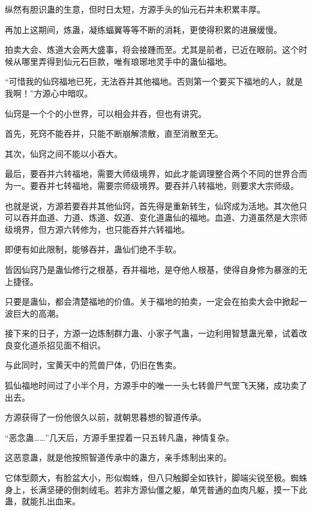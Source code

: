 
\begin{this_body}



纵然有胆识蛊的生意，但时日太短，方源手头的仙元石并未积累丰厚。

再加上这期间，炼蛊，凝练蝠翼等等不断的消耗，更使得积累的进展缓慢。

拍卖大会、炼道大会两大盛事，将会接踵而至。尤其是前者，已近在眼前。这个时候从哪里弄得到仙元石巨款，唯有琅琊地灵手中的蛊仙福地。

“可惜我的仙窍福地已死，无法吞并其他福地。否则第一个要买下福地的人，就是我啊！”方源心中暗叹。

仙窍是一个个的小世界，可以相会并吞，但也有讲究。

首先，死窍不能吞并，只能不断崩解溃散，直至消散至无。

其次，仙窍之间不能以小吞大。

最后，要吞并六转福地，需要大师级境界，如此才能调理整合两个不同的世界合而为一。要吞并七转福地，需要宗师级境界。要吞并八转福地，则要求大宗师级。

也就是说，方源若要吞并其他仙窍，首先得是重新转生，仙窍成为活地。其次他只可以吞并血道、力道、炼道、奴道、变化道蛊仙的福地。血道、力道虽然是大宗师级境界，但方源六转修为，也只能吞并六转福地。

即便有如此限制，能够吞并，蛊仙们绝不手软。

皆因仙窍乃是蛊仙修行之根基，吞并福地，是夺他人根基，使得自身修为暴涨的无上捷径。

只要是蛊仙，都会清楚福地的价值。关于福地的拍卖，一定会在拍卖大会中掀起一波巨大的高潮。

接下来的日子，方源一边炼制群力蛊、小家子气蛊，一边利用智慧蛊光晕，试着改良变化道杀招见面不相识。

与此同时，宝黄天中的荒兽尸体，仍旧在售卖。

狐仙福地时间过了小半个月，方源手中的唯一一头七转兽尸气罡飞天猪，成功卖了出去。

方源获得了一份他很久以前，就朝思暮想的智道传承。

“恶念蛊……”几天后，方源手里捏着一只五转凡蛊，神情复杂。

这恶意蛊，就是他按照智道传承中的蛊方，亲手炼制出来的。

它体型颇大，有脸盆大小，形似蜘蛛，但八只触脚全如铁针，脚端尖锐至极。蜘蛛身上，长满坚硬的倒刺绒毛。若非方源仙僵之躯，单凭普通的血肉凡躯，摸一下此蛊，就能扎出血来。


\end{this_body}
